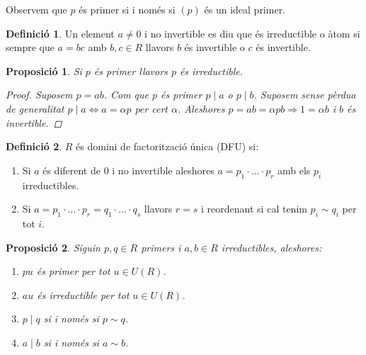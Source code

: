 \documentclass[a4paper,11pt]{report}
\newcommand{\im}{\Rightarrow}
\theoremstyle{theorem}
\newtheorem{proposicio}{\normalfont \sffamily\bfseries Proposició}[section]
\theoremstyle{definition}
\newtheorem{definicio}{\normalfont\sffamily\bfseries Definició}[section]
\begin{document}
 Observem que $p$ és primer si i només si $(p)$ és un ideal primer.
 \begin{definicio}
 	Un element $a\neq 0$ i no invertible es diu que és irreductible o àtom si sempre que $a=bc$ amb $b,c\in R$ llavors $b$ és invertible o $c$ és invertible.
 \end{definicio}
\begin{proposicio}
	Si $p$ és primer llavors $p$ és irreductible.\begin{proof}		
Suposem $p=ab$. Com que $p$ és primer $p\mid a $ o $p\mid b$. Suposem sense pèrdua de generalitat $p\mid a\Leftrightarrow a=\alpha p$ per cert $\alpha$. Aleshores $p=ab=\alpha p b\im 1=\alpha b$ i $b$ és invertible.	
\end{proof}
\end{proposicio}
\begin{definicio}
	$R$ és domini de factorització única (DFU) si:\begin{enumerate}
		\item Si $a$ és diferent de 0 i no invertible aleshores $a=p_1\cdot\ldots\cdot p_r$ amb els $p_i$ irreductibles.
		\item Si $a=p_1\cdot\ldots\cdot p_r=q_1\cdot\ldots\cdot q_s$ llavors $r=s$ i reordenant si cal tenim $p_i\sim q_i$ per tot $i$.
	\end{enumerate}
\end{definicio}
\begin{proposicio}
	Siguin $p,q\in R$ primers i $a,b\in R$ irreductibles, aleshores:\begin{enumerate}
		\item $pu$ és primer per tot $u\in U(R)$.
		\item $au$ és irreductible per tot $u\in U(R)$.
		\item $p\mid q$ si i només si $p\sim q$.
		\item $a\mid b$ si i només si $a\sim b$.
	\end{enumerate}
\end{proposicio}
\end{document}
